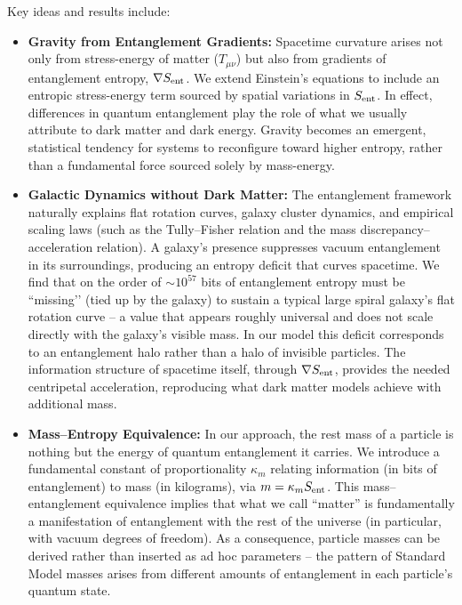 \documentclass[11pt]{article}
\begin{document}
Key ideas and results include:
\begin{itemize}
    \item \textbf{Gravity from Entanglement Gradients:} Spacetime curvature arises not only from stress-energy of matter ($T_{\mu\nu}$) but also from gradients of entanglement entropy, $\nabla S_{\rm ent}$. We extend Einstein’s equations to include an entropic stress-energy term sourced by spatial variations in $S_{\rm ent}$. In effect, differences in quantum entanglement play the role of what we usually attribute to dark matter and dark energy. Gravity becomes an emergent, statistical tendency for systems to reconfigure toward higher entropy, rather than a fundamental force sourced solely by mass-energy.

    \item \textbf{Galactic Dynamics without Dark Matter:} The entanglement framework naturally explains flat rotation curves, galaxy cluster dynamics, and empirical scaling laws (such as the Tully–Fisher relation and the mass discrepancy–acceleration relation). A galaxy’s presence suppresses vacuum entanglement in its surroundings, producing an entropy deficit that curves spacetime. We find that on the order of $\sim10^{57}$ bits of entanglement entropy must be ``missing’’ (tied up by the galaxy) to sustain a typical large spiral galaxy’s flat rotation curve – a value that appears roughly universal and does not scale directly with the galaxy’s visible mass. In our model this deficit corresponds to an entanglement halo rather than a halo of invisible particles. The information structure of spacetime itself, through $\nabla S_{\rm ent}$, provides the needed centripetal acceleration, reproducing what dark matter models achieve with additional mass.

    \item \textbf{Mass–Entropy Equivalence:} In our approach, the rest mass of a particle is nothing but the energy of quantum entanglement it carries. We introduce a fundamental constant of proportionality $\kappa_m$ relating information (in bits of entanglement) to mass (in kilograms), via $m = \kappa_m S_{\rm ent}$. This mass–entanglement equivalence implies that what we call “matter” is fundamentally a manifestation of entanglement with the rest of the universe (in particular, with vacuum degrees of freedom). As a consequence, particle masses can be derived rather than inserted as ad hoc parameters – the pattern of Standard Model masses arises from different amounts of entanglement in each particle’s quantum state.


\end{itemize}
\end{document}
